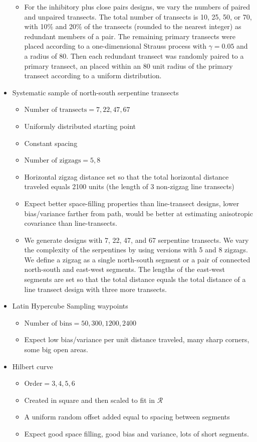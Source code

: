 \documentclass[review]{elsarticle}
\begin{document}
\begin{itemize}
\begin{itemize}
\item For the inhibitory plus close pairs designs, we vary the numbers of
paired and unpaired transects. The total number of transects is 10, 25, 50, or
70, with 10\% and 20\% of the transects (rounded to the nearest integer) as
redundant members of a pair. The remaining primary transects were placed
according to a one-dimensional Strauss process with \(\gamma = 0.05\) and a
radius of 80. Then each redundant transect was randomly paired to a primary
transect, an placed within an 80 unit radius of the primary transect according
to a uniform distribution.
\end{itemize}
\item Systematic sample of north-south serpentine transects
\begin{itemize}
\item \(\text{Number of transects} = 7, 22, 47, 67\)
\item Uniformly distributed starting point
\item Constant spacing
\item \(\text{Number of zigzags} = 5, 8\)
\item Horizontal zigzag distance set so that the total horizontal distance
traveled equals 2100 units (the length of 3 non-zigzag line transects)
\item Expect better space-filling properties than line-transect designs,
lower bias/variance farther from path, would be better at estimating
anisotropic covariance than line-transects.

\item We generate designs with 7, 22, 47, and 67 serpentine transects. We vary
the complexity of the serpentines by using versions with 5 and 8 zigzags. We
define a zigzag as a single north-south segment or a pair of connected
north-south and east-west segments. The lengths of the east-west segments are
set so that the total distance equals the total distance of a line transect
design with three more transects.
\end{itemize}
\item Latin Hypercube Sampling waypoints
\begin{itemize}
\item \(\text{Number of bins} = 50, 300, 1200, 2400\)
\item Expect low bias/variance per unit distance traveled, many sharp corners,
some big open areas.
\end{itemize}
\item Hilbert curve
\begin{itemize}
\item \(\text{Order} = 3, 4, 5, 6\)
\item Created in square and then scaled to fit in \(\mathcal{R}\)
\item A uniform random offset added equal to spacing between segments
\item Expect good space filling, good bias and variance, lots of short
segments.
\end{itemize}
\end{itemize}
\end{document}
